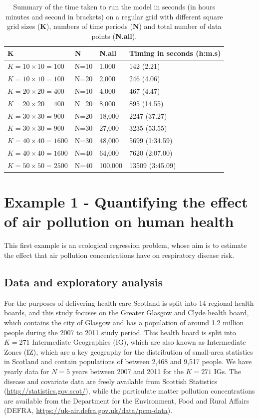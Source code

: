 \documentclass[article, nojss]{jss}
\begin{document}
\begin{table}
\begin{center}
\begin{tabular}{llll}
\hline \textbf{K}&\textbf{N}&\textbf{N.all} & \textbf{Timing in seconds (h:m.s)}\\\hline
$K=10\times 10=100$ &N=10& 1,000&142 (2.21)\\
$K=10\times 10=100$ &N=20& 2,000&246 (4.06)\\
$K=20 \times 20=400$ &N=10& 4,000&467 (4.47)\\
$K=20 \times 20=400$ & N=20& 8,000&895 (14.55)\\
$K=30 \times 30=900$ & N=20& 18,000&2247 (37.27)\\
$K=30 \times 30=900$ & N=30& 27,000&3235 (53.55) \\
$K=40 \times 40=1600$ & N=30& 48,000&5699 (1:34.59)\\
$K=40 \times 40=1600$ & N=40& 64,000&7620 (2:07.00)\\
$K=50 \times 50=2500$ & N=40& 100,000&13509 (3:45.09)\\\hline
\end{tabular}
\caption{Summary of the time taken to run the  model in seconds (in hours minutes and second in brackets) on a regular grid with different square grid sizes (\textbf{K}), numbers of time periods (\textbf{N}) and total number of data points (\textbf{N.all}).\label{tablesim2}}
\end{center}
\end{table}



\section{Example 1 - Quantifying the effect of air pollution on human health}\label{section5}
This first example is an ecological regression problem, whose aim is to estimate the effect that air pollution concentrations have on respiratory disease risk. 


\subsection{Data and exploratory analysis}
For the purposes of delivering health care Scotland is split into 14 regional health boards, and this study focuses on the Greater Glasgow and Clyde health board, which contains the city of Glasgow and has a population of around 1.2 million people during the 2007 to 2011 study period. This health board is split into $K=271$ Intermediate Geographies (IG), which are also known as Intermediate Zones (IZ), which are a key geography for the distribution of small-area statistics in Scotland and contain populations of between 2,468 and 9,517 people. We have yearly data for $N=5$ years  between 2007 and 2011 for the $K=271$ IGs. The disease and covariate data are freely available from Scottish Statistics (\url{http://statistics.gov.scot/}), while the particulate matter pollution concentrations are available from the Department for the Environment, Food and Rural Affairs (DEFRA, \url{https://uk-air.defra.gov.uk/data/pcm-data}).\\
\end{document}

